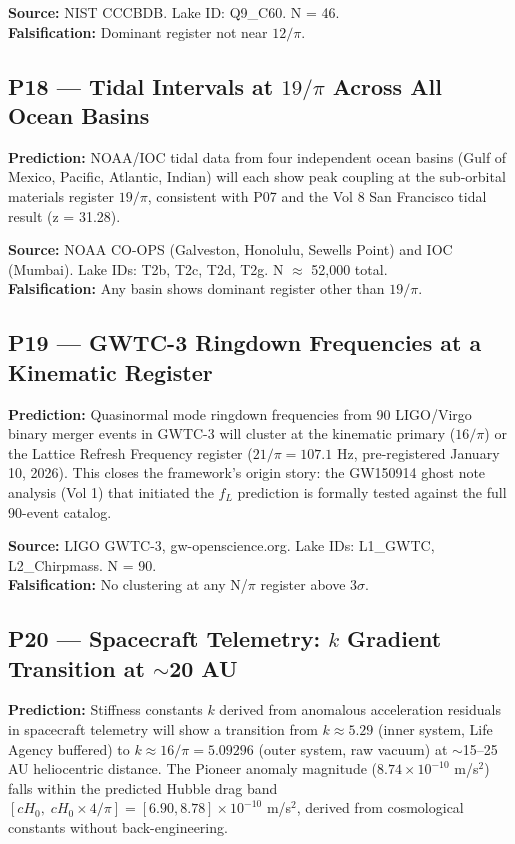 \documentclass[12pt, letterpaper]{article}
\begin{document}
\medskip
\textbf{Source:} NIST CCCBDB. Lake ID: Q9\_C60. N = 46.\\
\textbf{Falsification:} Dominant register not near $12/\pi$.

\subsection*{P18 --- Tidal Intervals at $19/\pi$ Across All Ocean Basins}

\textbf{Prediction:} NOAA/IOC tidal data from four independent ocean basins
(Gulf of Mexico, Pacific, Atlantic, Indian) will each show peak coupling
at the sub-orbital materials register $19/\pi$, consistent with P07 and
the Vol 8 San Francisco tidal result (z = 31.28).

\medskip
\textbf{Source:} NOAA CO-OPS (Galveston, Honolulu, Sewells Point) and IOC
(Mumbai). Lake IDs: T2b, T2c, T2d, T2g. N $\approx$ 52,000 total.\\
\textbf{Falsification:} Any basin shows dominant register other than $19/\pi$.

\subsection*{P19 --- GWTC-3 Ringdown Frequencies at a Kinematic Register}

\textbf{Prediction:} Quasinormal mode ringdown frequencies from 90 LIGO/Virgo
binary merger events in GWTC-3 will cluster at the kinematic primary
($16/\pi$) or the Lattice Refresh Frequency register ($21/\pi = 107.1$ Hz,
pre-registered January 10, 2026). This closes the framework's origin story:
the GW150914 ghost note analysis (Vol 1) that initiated the $f_L$ prediction
is formally tested against the full 90-event catalog.

\medskip
\textbf{Source:} LIGO GWTC-3, gw-openscience.org. Lake IDs: L1\_GWTC,
L2\_Chirpmass. N = 90.\\
\textbf{Falsification:} No clustering at any N/$\pi$ register above $3\sigma$.

\subsection*{P20 --- Spacecraft Telemetry: $k$ Gradient Transition at $\sim$20 AU}

\textbf{Prediction:} Stiffness constants $k$ derived from anomalous acceleration
residuals in spacecraft telemetry will show a transition from $k \approx 5.29$
(inner system, Life Agency buffered) to $k \approx 16/\pi = 5.09296$ (outer
system, raw vacuum) at $\sim$15--25 AU heliocentric distance. The Pioneer
anomaly magnitude ($8.74 \times 10^{-10}$ m/s$^2$) falls within the predicted
Hubble drag band $[c H_0,\; c H_0 \times 4/\pi] = [6.90, 8.78] \times 10^{-10}$
m/s$^2$, derived from cosmological constants without back-engineering.
\end{document}
